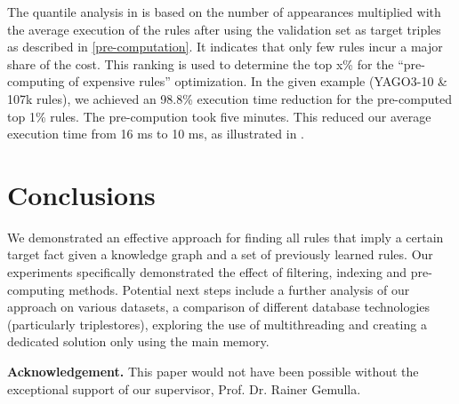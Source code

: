 \documentclass[english]{lni}
\begin{document}
The quantile analysis in  is based on the number of appearances multiplied with the average execution of the rules after using the validation set as target triples as described in \ref{pre-computation}. It indicates that only few rules incur a major share of the cost. This ranking is used to determine the top x\% for the “pre-computing of expensive rules” optimization. In the given example (YAGO3-10 \& 107k rules), we achieved an 98.8\% execution time reduction for the pre-computed top 1\% rules. The pre-compution took five minutes. This reduced our average execution time from 16 ms to 10 ms, as illustrated in .


\section{Conclusions}

%
%

We demonstrated an effective approach for finding all rules that imply a certain target fact given a knowledge graph and a set of previously learned rules. Our experiments specifically demonstrated the effect of filtering, indexing and pre-computing methods. Potential next steps include a further analysis of our approach on various datasets, a comparison of different database technologies (particularly triplestores), exploring the use of multithreading and creating a dedicated solution only using the main memory.

\textbf{Acknowledgement.} This paper would not have been possible without the exceptional support of our supervisor, Prof. Dr. Rainer Gemulla.

\end{document}
